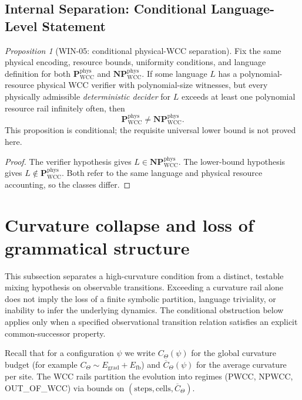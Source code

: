 \documentclass[12pt]{article}
\theoremstyle{remark}
\newtheorem{proposition}[theorem]{Proposition}
\begin{document}
\subsection{Internal Separation: Conditional Language-Level Statement}
\begin{proposition}[WIN-05: conditional physical-WCC separation]
\label{thm:pwcc-neq-npwcc}
Fix the same physical encoding, resource bounds, uniformity conditions,
and language definition for both
$\mathbf{P}_{\mathrm{WCC}}^{\mathrm{phys}}$ and
$\mathbf{NP}_{\mathrm{WCC}}^{\mathrm{phys}}$.
If some language $L$ has a polynomial-resource physical WCC verifier
with polynomial-size witnesses, but every physically admissible
\emph{deterministic decider} for $L$ exceeds at least one polynomial
resource rail infinitely often, then
\[
\mathbf{P}_{\mathrm{WCC}}^{\mathrm{phys}}\ne
\mathbf{NP}_{\mathrm{WCC}}^{\mathrm{phys}}.
\]
This proposition is conditional; the requisite universal lower bound
is not proved here.
\end{proposition}
\begin{proof}
The verifier hypothesis gives
$L\in\mathbf{NP}_{\mathrm{WCC}}^{\mathrm{phys}}$.
The lower-bound hypothesis gives
$L\notin\mathbf{P}_{\mathrm{WCC}}^{\mathrm{phys}}$.
Both refer to the same language and physical resource accounting, so
the classes differ.
\end{proof}

\section{Curvature collapse and loss of grammatical structure}

This subsection separates a high-curvature condition from a distinct,
testable mixing hypothesis on observable transitions. Exceeding a
curvature rail alone does not imply the loss of a finite symbolic
partition, language triviality, or inability to infer the underlying
dynamics. The conditional obstruction below applies only when a
specified observational transition relation satisfies an explicit
common-successor property.

Recall that for a configuration $\psi$ we write $C_\Theta(\psi)$ for the
global curvature budget (for example $C_\Theta \sim E_{\mathrm{grad}} + E_{\mathrm{fb}}$)
and $\overline{C}_\Theta(\psi)$ for the average curvature per site.
The WCC rails partition the evolution into regimes (PWCC, NPWCC, OUT\_OF\_WCC)
via bounds on $(\text{steps}, \text{cells}, \overline{C}_\Theta)$.
\end{document}
